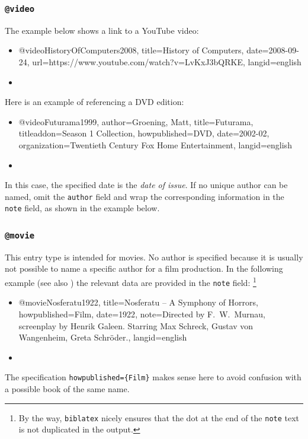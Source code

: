 \subsubsection{\texttt{\bfseries @video}}
\label{sec:@video}

The example below shows a link to a YouTube video:
%
\begin{itemize}
\item[]
\begin{GenericCode}[numbers=none]
@video{HistoryOfComputers2008,
  title={History of Computers},
  date={2008-09-24},
  url={https://www.youtube.com/watch?v=LvKxJ3bQRKE},
  langid={english}
}
\end{GenericCode}
\item[\cite{HistoryOfComputers2008}] 
\end{itemize}

\noindent
Here is an example of referencing a DVD edition:
%
\begin{itemize}
\item[]
\begin{GenericCode}[numbers=none]
@video{Futurama1999,
  author={Groening, Matt},
  title={Futurama},
  titleaddon={Season 1 Collection},
  howpublished={DVD},
  date={2002-02},
  organization={Twentieth Century Fox Home Entertainment},
  langid={english}
}
\end{GenericCode}
\item[\cite{Futurama1999}] 
\end{itemize}
%
In this case, the specified date is the \emph{date of issue}. If no unique
author can be named, omit the \texttt{author} field and wrap the corresponding
information in the \texttt{note} field, as shown in the example below.

\subsubsection{\texttt{\bfseries @movie}}
\label{sec:@movie}

This entry type is intended for movies. No author is specified because it is
usually not possible to name a specific author for a film production. In the
following example (see also \cite{Psycho1960}) the relevant data are provided
in the \texttt{note} field:%
\footnote{By the way, \texttt{biblatex} nicely ensures that the dot at the end
of the \texttt{note} text is not duplicated in the output.}
%
\begin{itemize}
\item[]
\begin{GenericCode}[numbers=none]
@movie{Nosferatu1922,
  title={Nosferatu -- A Symphony of Horrors},
  howpublished={Film},
  date={1922},
  note={Directed by F.\ W.\ Murnau, screenplay by Henrik Galeen. Starring Max Schreck, Gustav von Wangenheim, Greta Schröder.},
  langid={english}
}
\end{GenericCode}
\item[\cite{Nosferatu1922}] 
\end{itemize}
%
The specification \verb!howpublished={Film}! makes sense here to avoid confusion
with a possible book of the same name.

